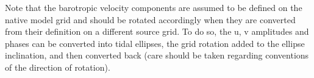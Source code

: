 \documentclass[../main/NEMO_manual]{subfiles}
\begin{document}
Note that the barotropic velocity components are assumed to be defined
on the native model grid and should be rotated accordingly when they
are converted from their definition on a different source grid. To do
so, the u, v amplitudes and phases can be converted into tidal
ellipses, the grid rotation added to the ellipse inclination, and then
converted back (care should be taken regarding conventions of the
direction of rotation). %

\biblio

\pindex
\end{document}
